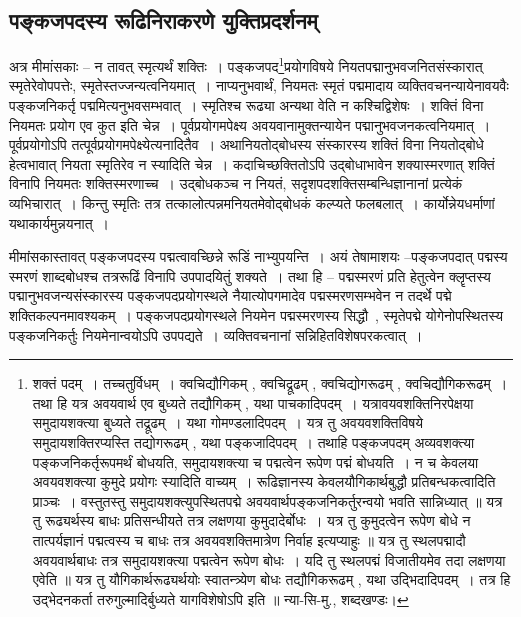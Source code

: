 		\subsection{पङ्कजपदस्य रूढिनिराकरणे युक्तिप्रदर्शनम्} 

			\begin{small}
				
				अत्र मीमांसकाः – न तावत् स्मृत्यर्थं शक्तिः~। पङ्कजपद\footnote{शक्तं पदम्~। तच्चतुर्विधम्~। क्वचिद्यौगिकम् , क्वचिद्रूढम् , क्वचिद्योगरूढम् , क्वचिद्यौगिकरूढम्~। तथा हि यत्र अवयवार्थ एव बुध्यते तद्यौगिकम् , यथा पाचकादिपदम्~। यत्रावयवशक्तिनिरपेक्षया समुदायशक्त्या बुध्यते तद्रूढम्~। यथा गोमण्डलादिपदम्~।  यत्र तु अवयवशक्तिविषये समुदायशक्तिरप्यस्ति तद्योगरूढम् , यथा पङ्कजादिपदम्~। तथाहि पङ्कजपदम् अव्यवशक्त्या पङ्कजनिकर्तृरूपमर्थं बोधयति, समुदायशक्त्या च पद्मत्वेन रूपेण पद्मं बोधयति~। न च केवलया अवयवशक्त्या कुमुदे प्रयोगः स्यादिति वाच्यम्~। रूढिज्ञानस्य केवलयौगिकार्थबुद्धौ  प्रतिबन्धकत्वादिति प्राञ्चः~। वस्तुतस्तु समुदायशक्त्युपस्थितपद्मे अवयवार्थपङ्कजनिकर्तुरन्वयो भवति सान्निध्यात् ॥ यत्र तु रूढ्यर्थस्य बाधः प्रतिसन्धीयते तत्र लक्षणया कुमुदादेर्बोधः~। यत्र तु कुमुदत्वेन  रूपेण बोधे न तात्पर्यज्ञानं पद्मत्वस्य च बाधः तत्र अवयवशक्तिमात्रेण निर्वाह इत्यप्याहुः ॥ यत्र तु स्थलपद्मादौ अवयवार्थबाधः तत्र समुदायशक्त्या पद्मत्वेन रूपेण बोधः~। यदि तु स्थलपद्मं विजातीयमेव तदा लक्षणया एवेति ॥ यत्र तु यौगिकार्थरूढ्यर्थयोः स्वातन्त्र्येण बोधः तद्यौगिकरूढम् , यथा उद्भिदादिपदम्~। तत्र हि उद्भेदनकर्ता तरुगुल्मादिर्बुध्यते यागविशेषोऽपि इति ॥ न्या-सि-मु., शब्दखण्डः।}प्रयोगविषये नियतपद्मानुभवजनितसंस्कारात् स्मृतेरेवोपपत्तेः, स्मृतेस्तज्जन्यत्वनियमात्~। नाप्यनुभवार्थं, नियमतः स्मृतं पद्ममादाय व्यक्तिवचनन्यायेनावयवैः पङ्कजनिकर्तृ पद्ममित्यनुभवसम्भवात्~। स्मृतिश्च रूढ्या अन्यथा वेति न कश्चिद्विशेषः~। शक्तिं विना नियमतः प्रयोग एव कुत इति चेन्न~। पूर्वप्रयोगमपेक्ष्य अवयवानामुक्तन्यायेन पद्मानुभवजनकत्वनियमात्~। पूर्वप्रयोगोऽपि तत्पूर्वप्रयोगमपेक्ष्येत्यनादितैव~। अथानियतोद्बोधस्य संस्कारस्य शक्तिं विना नियतोद्बोधे हेत्वभावात् नियता स्मृतिरेव न स्यादिति चेन्न~। कदाचिच्छक्तितोऽपि उद्बोधाभावेन शक्यास्मरणात् शक्तिं विनापि नियमतः शक्तिस्मरणाच्च~। उद्बोधकञ्च न नियतं, सदृशपदशक्तिसम्बन्धिज्ञानानां प्रत्येकं व्यभिचारात्~। किन्तु स्मृतिः तत्र तत्कालोत्पन्नमनियतमेवोद्बोधकं कल्प्यते फलबलात्~। कार्योन्नेयधर्माणां यथाकार्यमुन्नयनात्~। 
			\end{small}

			मीमांसकास्तावत् पङ्कजपदस्य पद्मत्वावच्छिन्ने रूडिं नाभ्युपयन्ति~।  अयं तेषामाशयः –पङ्कजपदात् पद्मस्य स्मरणं शाब्दबोधश्च तत्ररूढिं विनापि उपपादयितुं शक्यते~।  तथा हि – पद्मस्मरणं प्रति हेतुत्वेन  क्लॄप्तस्य पद्मानुभवजन्यसंस्कारस्य पङ्कजपदप्रयोगस्थले नैयात्योपगमादेव पद्मस्मरणसम्भवेन न तदर्थे पद्मे शक्तिकल्पनमावश्यकम्~।  पङ्कजपदप्रयोगस्थले नियमेन पद्मस्मरणस्य सिद्धौ~, स्मृतेपद्मे योगेनोपस्थितस्य पङ्कजनिकर्तुः नियमेनान्वयोऽपि उपपद्यते~।  व्यक्तिवचनानां सन्निहितविशेषपरकत्वात्~।  


